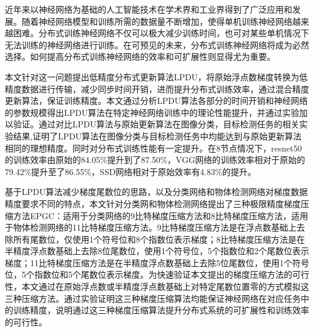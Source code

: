 \begin{cabstract}
近年来以神经网络为基础的人工智能技术在学术界和工业界得到了广泛应用和发展。随着神经网络模型和训练所需的数据量不断增加，使得单机训练神经网络越来越困难。分布式训练神经网络不仅可以极大减少训练时间，也可对某些单机情况下无法训练的神经网络进行训练。在可预见的未来，分布式训练神经网络将成为必然选择。如何提高分布式训练神经网络的效率和可扩展性则显得尤为重要。

本文针对这一问题提出低精度分布式更新算法LPDU，将原始浮点数梯度转换为低精度数据进行传输，减少同步时间开销，进而提升分布式训练效率，通过混合精度更新算法，保证训练精度。本文通过分析LPDU算法各部分的时间开销和神经网络的参数规模得出LPDU算法在特定神经网络训练中的理论性能提升，并通过实验加以验证。通过对比LPDU算法与原始更新算法在图像分类，目标检测任务的相关实验结果,证明了LPDU算法在图像分类与目标检测任务中均能达到与原始更新算法相同的理想精度。同时对分布式训练性能有一定提升。在8节点情况下，resnet50的训练效率由原始的84.05\%提升到了87.50\%，VGG网络的训练效率相对于原始的79.42\%提升至了86.55\%，SSD网络相对于原始效率有4.83\%的提升。

基于LPDU算法减少梯度尾数位的思路，以及分类网络和物体检测网络对梯度数据精度要求不同的特点，本文针对分类网和物体检测网络提出了三种极限精度梯度压缩方法EPGC：适用于分类网络的9比特梯度压缩方法和8比特梯度压缩方法，适用于物体检测网络的11比特梯度压缩方法。9比特梯度压缩方法是在浮点数基础上去除所有尾数位，仅使用1个符号位和8个指数位表示梯度；8比特梯度压缩方法是在半精度浮点数基础上去除8位尾数位，使用1个符号位，5个指数位和2个尾数位表示梯度；11比特梯度压缩方法是在半精度浮点数基础上去除5位尾数位，使用1个符号位，5个指数位和5个尾数位表示梯度。为快速验证本文提出的梯度压缩方法的可行性，本文通过在原始浮点数或半精度浮点数基础上对特定尾数位置零的方式模拟这三种压缩方法。通过实验证明这三种梯度压缩算法均能保证神经网络在对应任务中的训练精度，说明通过这三种梯度压缩算法提升分布式系统的可扩展性和训练效率的可行性。

\end{cabstract}

